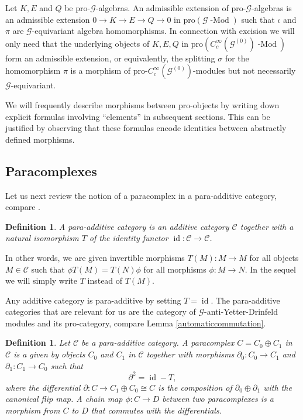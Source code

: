 \documentclass{amsart}
\newtheorem{dfn}[thm]{Definition}
\newcommand{\G}{\mathcal{G}}
\newcommand{\ccinfty}{C_c^\infty}
\newcommand{\pro}{\mathrm{pro}}
\DeclareMathOperator{\id}{id}
\begin{document}
Let $ K, E $ and $ Q $ be pro-$ \G $-algebras. An admissible extension of pro-$ \G $-algebras is an admissible extension 
$ 0 \rightarrow K \rightarrow E \rightarrow Q 
\rightarrow 0 $ in $ \pro(\G \operatorname{-Mod}) $ such that $ \iota $ and $ \pi $ are $ \G $-equivariant algebra homomorphisms. In connection with excision we will only need that the underlying objects of $ K,E, Q $ in $ \pro(\ccinfty(\G^{(0)}) \operatorname{-Mod}) $ form an admissible extension, or equivalently, the splitting $ \sigma $ for the homomorphism $ \pi $ is a morphism of pro-$ \ccinfty(\G^{(0)}) $-modules but not necessarily $ \G $-equivariant. 

We will frequently describe morphisms between pro-objects by writing down explicit formulas involving ``elements'' in subsequent sections. This can be justified by observing that these formulas encode identities between abstractly defined mor\-phisms. 

\subsection{Paracomplexes} \label{secpara}

Let us next review the notion of a paracomplex in a para-additive category, compare \cite{VOIGT_equivariantperiodiccyclichomology}.  

\begin{dfn} 
A para-additive category is an additive category $ \mathcal{C} $ 
together with a natural isomorphism $ T $ of the identity functor $ \id: \mathcal{C} \rightarrow \mathcal{C} $.   
\end{dfn}

In other words, we are given invertible morphisms $ T(M): M \rightarrow M $ for all 
objects $ M \in \mathcal{C} $ such that $ \phi  T(M) = T(N) \phi $ for all morphisms $ \phi: M \rightarrow N $. In the sequel we will 
simply write $ T $ instead of $ T(M) $. 

Any additive category is para-additive by setting $ T = \id $. The para-additive categories that are relevant for us are the category of $ \G $-anti-Yetter-Drinfeld modules and its pro-category, compare Lemma \ref{automaticcommutation}. 

\begin{dfn} 
Let $ \mathcal{C} $ be a para-additive category. 
A paracomplex $ C = C_0 \oplus C_1 $ in $ \mathcal{C} $ is a given by objects $ C_0 $ and $ C_1 $ in $ \mathcal{C} $ together with  morphisms $ \partial_0: C_0 \rightarrow C_1 $ and $ \partial_1: C_1 \rightarrow C_0 $ such that
$$ 
\partial^2 = \id - T, 
$$
where the differential $ \partial: C \rightarrow C_1 \oplus C_0 \cong C $ is the composition of $ \partial_0 \oplus \partial_1 $
with the canonical flip map. A chain map $ \phi: C \rightarrow D $ between two paracomplexes is a morphism from $ C $ to $ D $ that commutes with
the differentials.
\end{dfn}
\end{document}
